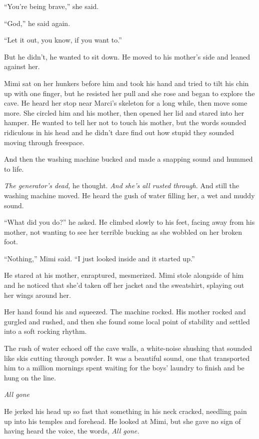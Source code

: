 ``You're being brave,'' she said.

``God,'' he said again.

``Let it out, you know, if you want to.''

But he didn't, he wanted to sit down.  He moved to his mother's side
and leaned against her.

Mimi sat on her hunkers before him and took his hand and tried to tilt
his chin up with one finger, but he resisted her pull and she rose and
began to explore the cave.  He heard her stop near Marci's skeleton
for a long while, then move some more.  She circled him and his
mother, then opened her lid and stared into her hamper.  He wanted to
tell her not to touch his mother, but the words sounded ridiculous in
his head and he didn't dare find out how stupid they sounded moving
through freespace.

And then the washing machine bucked and made a snapping sound and
hummed to life.

\textit{The generator's dead,} he thought.  \textit{And she's all
rusted through.} And still the washing machine moved.  He heard the
gush of water filling her, a wet and muddy sound.

``What did you do?'' he asked.  He climbed slowly to his feet, facing
away from his mother, not wanting to see her terrible bucking as she
wobbled on her broken foot.

``Nothing,'' Mimi said.  ``I just looked inside and it started up.''

He stared at his mother, enraptured, mesmerized.  Mimi stole alongside
of him and he noticed that she'd taken off her jacket and the
sweatshirt, splaying out her wings around her.

Her hand found his and squeezed.  The machine rocked.  His mother
rocked and gurgled and rushed, and then she found some local point of
stability and settled into a soft rocking rhythm.

The rush of water echoed off the cave walls, a white-noise shushing
that sounded like skis cutting through powder.  It was a beautiful
sound, one that transported him to a million mornings spent waiting
for the boys' laundry to finish and be hung on the line.

\textit{All gone}

He jerked his head up so fast that something in his neck cracked,
needling pain up into his temples and forehead.  He looked at Mimi,
but she gave no sign of having heard the voice, the words, \textit{All
gone.}

